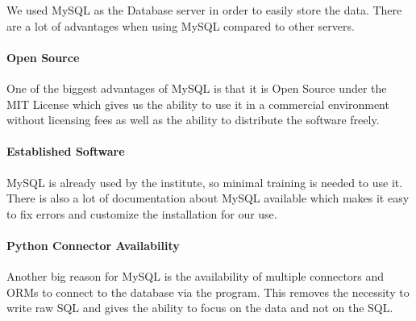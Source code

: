 We used MySQL as the Database server in order to easily store the data.
There are a lot of advantages when using MySQL compared to other servers.

\paragraph{Open Source}
One of the biggest advantages of MySQL is that it is Open Source under the MIT License which gives us the ability to use it in a commercial environment without licensing fees as well as the ability to distribute the software freely.

\paragraph{Established Software}
MySQL is already used by the institute, so minimal training is needed to use it.
There is also a lot of documentation about MySQL available which makes it easy to fix errors and customize the installation for our use.

\paragraph{Python Connector Availability}
Another big reason for MySQL is the availability of multiple connectors and ORMs to connect to the database via the program. This removes the necessity to write raw SQL and gives the ability to focus on the data and not on the SQL. 